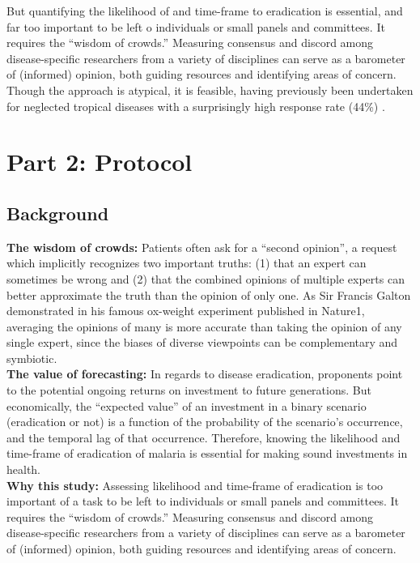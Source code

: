 \documentclass{article}
\begin{document}
\noindent But quantifying the likelihood of and time-frame to eradication is essential, and far too important to be left o individuals or small panels and committees. It requires the “wisdom of crowds.” Measuring consensus and discord among disease-specific researchers from a variety of disciplines can serve as a barometer of (informed) opinion, both guiding resources and identifying areas of concern. Though the approach is atypical, it is feasible, having previously been undertaken for neglected tropical diseases with a surprisingly high response rate (44\%) \cite{Keenan2013}. \\


\newpage
\section*{Part 2: Protocol}


\subsection*{Background}

\noindent \textbf{The wisdom of crowds:} Patients often ask for a “second opinion”, a request which implicitly recognizes two important truths: (1) that an expert can sometimes be wrong and (2) that the combined opinions of multiple experts can better approximate the truth than the opinion of only one. As Sir Francis Galton demonstrated in his famous ox-weight experiment published in Nature1, averaging the opinions of many is more accurate than taking the opinion of any single expert, since the biases of diverse viewpoints can be complementary and symbiotic. \\

\noindent \textbf{The value of forecasting:} In regards to disease eradication, proponents point to the potential ongoing returns on investment to future generations. But economically, the “expected value” of an investment in a binary scenario (eradication or not) is a function of the probability of the scenario’s occurrence, and the temporal lag of that occurrence. Therefore, knowing the likelihood and time-frame of eradication of malaria is essential for making sound investments in health. \\

\noindent \textbf{Why this study:} Assessing likelihood and time-frame of eradication is too important of a task to be left to individuals or small panels and committees. It requires the “wisdom of crowds.” Measuring consensus and discord among disease-specific researchers from a variety of disciplines can serve as a barometer of (informed) opinion, both guiding resources and identifying areas of concern.
\end{document}
